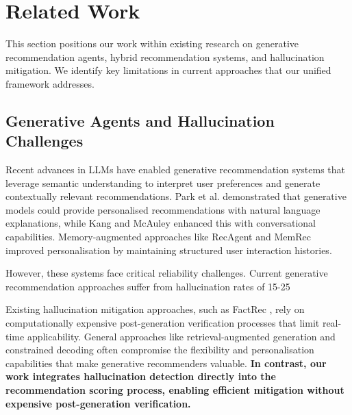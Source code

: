 \documentclass[acmsmall]{acmart}
\begin{document}

\section{Related Work}

This section positions our work within existing research on generative recommendation agents, hybrid recommendation systems, and hallucination mitigation. We identify key limitations in current approaches that our unified framework addresses.

\subsection{Generative Agents and Hallucination Challenges}

Recent advances in LLMs have enabled generative recommendation systems that leverage semantic understanding to interpret user preferences and generate contextually relevant recommendations. Park et al. \cite{park2024llm} demonstrated that generative models could provide personalised recommendations with natural language explanations, while Kang and McAuley \cite{kang2023conversationalrec} enhanced this with conversational capabilities. Memory-augmented approaches like RecAgent \cite{mitchell2024recagent} and MemRec \cite{chen2024memrec} improved personalisation by maintaining structured user interaction histories.

However, these systems face critical reliability challenges. Current generative recommendation approaches suffer from hallucination rates of 15-25%

Existing hallucination mitigation approaches, such as FactRec \cite{li2024factrec}, rely on computationally expensive post-generation verification processes that limit real-time applicability. General approaches like retrieval-augmented generation \cite{lewis2020retrieval} and constrained decoding \cite{yang2024constrained} often compromise the flexibility and personalisation capabilities that make generative recommenders valuable. \textbf{In contrast, our work integrates hallucination detection directly into the recommendation scoring process, enabling efficient mitigation without expensive post-generation verification.}
\end{document}
